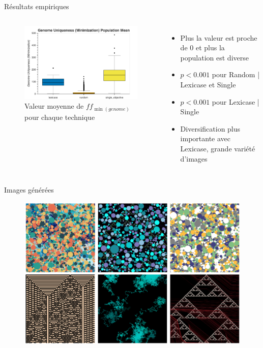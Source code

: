 \documentclass[aspectratio=169]{beamer}
\begin{document}
\begin{frame}{Résultats empiriques}
    \begin{columns}
        \begin{figure}
            \centering
            \includegraphics[scale=0.4]{fig/uniqueness.png}
            \caption{Valeur moyenne de $ff_{\min(genome)}$ pour chaque technique}
        \end{figure}
        \begin{itemize}
            \item Plus la valeur est proche de 0 et plus la population est diverse
            \item $p < 0.001$ pour Random | Lexicase et Single
            \item $p < 0.001$ pour Lexicase | Single 
            \item Diversification plus importante avec Lexicase, grande variété d'images 
        \end{itemize}
    \end{columns}
\end{frame}

\begin{frame}{Images générées}
    \begin{figure}
        \centering
        \includegraphics[scale=0.32]{fig/results1.png}
    \end{figure}
\end{frame}
\end{document}

